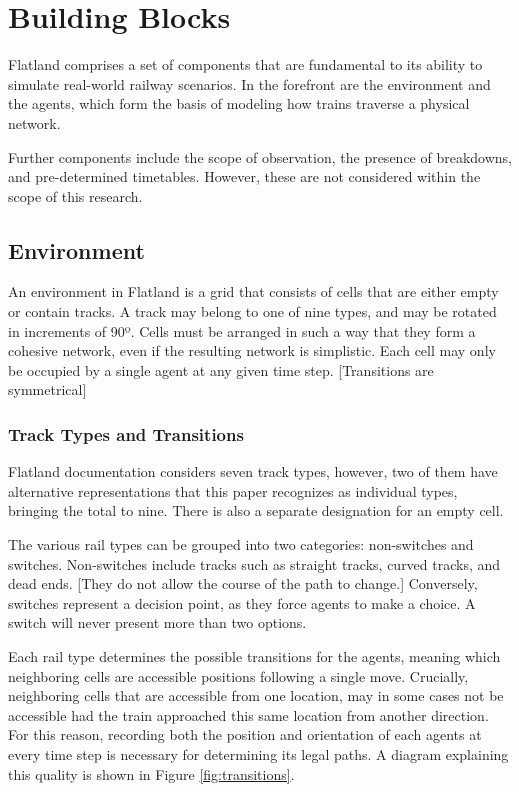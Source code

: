 \documentclass[11pt]{article}
\begin{document}
\pagebreak
\section{Building Blocks}
Flatland comprises a set of components that are fundamental to its ability to simulate real-world railway scenarios.  In the forefront are the environment and the agents, which form the basis of modeling how trains traverse a physical network.

Further components include the scope of observation, the presence of breakdowns, and pre-determined timetables.  However, these are not considered within the scope of this research.

\subsection{Environment}
An environment in Flatland is a grid that consists of cells that are either empty or contain tracks.  A track may belong to one of nine types, and may be rotated in increments of 90º.  Cells must be arranged in such a way that they form a cohesive network, even if the resulting network is simplistic.  Each cell may only be occupied by a single agent at any given time step.  [Transitions are symmetrical]

\subsubsection{Track Types and Transitions}
Flatland documentation considers seven track types, however, two of them have alternative representations that this paper recognizes as individual types, bringing the total to nine.  There is also a separate designation for an empty cell.

The various rail types can be grouped into two categories: non-switches and switches.  Non-switches include tracks such as straight tracks, curved tracks, and dead ends.  [They do not allow the course of the path to change.]  Conversely, switches represent a decision point, as they force agents to make a choice.  A switch will never present more than two options.

Each rail type determines the possible transitions for the agents, meaning which neighboring cells are accessible positions following a single move.  Crucially, neighboring cells that are accessible from one location, may in some cases not be accessible had the train approached this same location from another direction.  For this reason, recording both the position and orientation of each agents at every time step is necessary for determining its legal paths.  A diagram explaining this quality is shown in Figure \ref{fig:transitions}.
\end{document}
